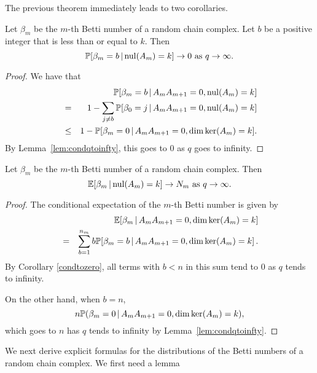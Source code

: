   



The previous theorem immediately leads to two corollaries.  

\begin{corollary}\label{condtozero}
Let $\beta_m$ be the $m$-th Betti number of a random chain complex. Let $b$ be a positive integer that is less than or equal to $k$. Then 
\[
\mathbb{P}[\beta_m = b \,|\, \mathrm{nul}(A_{m}) = k ] \to 0 \textrm{ as } q\to\infty.
\]
\end{corollary}
\begin{proof}
We have that
	\begin{eqnarray*}
	&&\mathbb{P}[\beta_m = b \,|\, A_{m}A_{m+1} = 0, \mathrm{nul}(A_{m}) = k ]\\
    &=& 1 - \sum_{j\neq b}\mathbb{P}[\beta_0 = j \,|\, A_{m}A_{m+1} = 0, \mathrm{nul}(A_{m}) = k ]\\
    &\leq& 1 - \mathbb{P}[\beta_m = 0 \,|\, A_{m}A_{m+1} = 0, \dim\ker(A_{m}) = k ].
	\end{eqnarray*}
By Lemma~\ref{lem:condqtoinfty}, this goes to $0$ as $q$ goes to infinity.
\end{proof}

\begin{corollary}
Let $\beta_m$ be the $m$-th Betti number of a random chain complex.  Then 
\[
\mathbb{E}[\beta_m \,|\, \mathrm{nul}(A_{m}) = k ] \to  N_m\textrm{ as } q\to\infty.
\]
\begin{proof}
The conditional expectation of the $m$-th Betti number is given by
	\begin{eqnarray*}
	& & \mathbb{E}[\beta_m \,|\, A_{m}A_{m+1} = 0, \dim\ker(A_{m}) = k ]\\
	&=& \sum_{b=1}^{n_m} b \mathbb{P}[\beta_m = b \,|\, A_{m}A_{m+1} = 0, \dim\ker(A_{m}) = k ] \, .
	\end{eqnarray*}
By Corollary \ref{condtozero}, all terms with $b< n$ in this sum tend to 
$0$ as $q$ tends to infinity. 

On the other hand, when $b=n$, 
\[
n\mathbb{P}(\beta_m=0\,|\, A_{m}A_{m+1} = 0, \dim\ker(A_{m}) = k ),
\]
which goes to $n$ has $q$ tends to infinity by Lemma~\ref{lem:condqtoinfty}.
\end{proof}
\end{corollary}

We next derive explicit formulas for the distributions of the Betti numbers of a random chain complex. We first need a lemma

